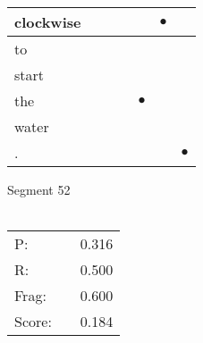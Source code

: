 \documentclass[landscape]{article}
\newcommand{\ssp}{\hspace{2pt}}
\newcommand{\mex}{\cellcolor{g}$\bullet$}
\begin{document}
\begin{tabular}{|l|p{10pt}|p{10pt}|p{10pt}|p{10pt}|p{10pt}|p{10pt}|}
\hline
\ssp \cellcolor{ref4}clockwise \ssp&\hspace{2pt}&\hspace{2pt}&\hspace{2pt}&\hspace{2pt}&\hspace{2pt}\mex&\hspace{2pt}\\
\hline
\ssp to \ssp&\hspace{2pt}&\hspace{2pt}&\hspace{2pt}&\hspace{2pt}&\hspace{2pt}&\hspace{2pt}\\
\hline
\ssp start \ssp&\hspace{2pt}&\hspace{2pt}&\hspace{2pt}&\hspace{2pt}&\hspace{2pt}&\hspace{2pt}\\
\hline
\ssp \cellcolor{ref3}the \ssp&\hspace{2pt}&\hspace{2pt}&\hspace{2pt}&\hspace{2pt}\mex&\hspace{2pt}&\hspace{2pt}\\
\hline
\ssp water \ssp&\hspace{2pt}&\hspace{2pt}&\hspace{2pt}&\hspace{2pt}&\hspace{2pt}&\hspace{2pt}\\
\hline
\ssp \cellcolor{ref5}. \ssp&\hspace{2pt}&\hspace{2pt}&\hspace{2pt}&\hspace{2pt}&\hspace{2pt}&\hspace{2pt}\mex\\
\hline
\end{tabular}

\vspace{6pt}
\noindent Segment 52\\\\
\noindent\begin{tabular}{lm{12pt}r}
\hline
P:&&0.316\\
R:&&0.500\\
Frag:&&0.600\\
Score:&&0.184\\
\end{tabular}
\end{document}
